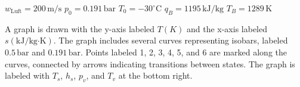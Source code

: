 \( w_{\text{Luft}} = 200 \, \text{m/s} \)  
\( p_0 = 0.191 \, \text{bar} \)  
\( T_0 = -30^\circ \text{C} \)  
\( q_B = 1195 \, \text{kJ/kg} \)  
\( T_B = 1289 \, \text{K} \)  

A graph is drawn with the y-axis labeled \( T(K) \) and the x-axis labeled \( s(\text{kJ/kg·K}) \). The graph includes several curves representing isobars, labeled \( 0.5 \, \text{bar} \) and \( 0.191 \, \text{bar} \). Points labeled 1, 2, 3, 4, 5, and 6 are marked along the curves, connected by arrows indicating transitions between states. The graph is labeled with \( T_s \), \( h_s \), \( p_v \), and \( T_v \) at the bottom right.